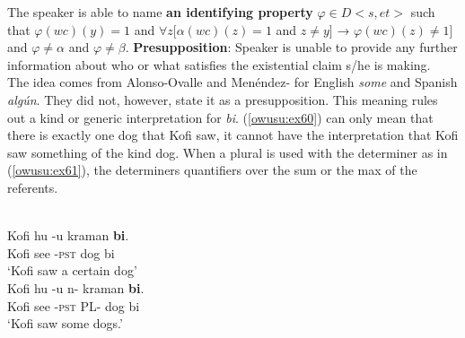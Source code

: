 \documentclass[output=paper,modfonts,nonflat,draftmode]{langsci/langscibook}
\begin{document}
\ex \label{51} The speaker is able to name \textbf{an identifying property} $\varphi \in D <s,et>$ such that $\varphi(wc)(y)=1$ and $\forall z[\alpha(wc)(z)=1$ and $z\neq y]$ → $\varphi(wc)(z)\neq 1]$ and $\varphi \neq \alpha$ and $\varphi \neq \beta$.
\ex \textbf{Presupposition}: Speaker is unable to provide any further information about who or what satisfies the existential claim s/he is making.\\ The idea comes from Alonso-Ovalle and Menéndez-\citet{Benito2003} for English \emph{some} and Spanish \emph{alg\'un}. They did not, however, state it as a presupposition.  
\z \z This meaning rules out a kind or generic interpretation for \emph{bi}. (\ref{owusu:ex60}) can only mean that there is exactly one dog that Kofi saw, it cannot have the interpretation that Kofi saw something of the kind dog. When a plural is used with the determiner as in (\ref{owusu:ex61}), the determiners quantifiers over the sum or the max of the referents.

\ea {}\\
\ea\label{owusu:ex60}
\gll Kofi hu -u kraman \textbf{bi}.\\
Kofi see -\textsc{pst} dog bi\\
\glt `Kofi saw a certain dog'\\
	
\ex \label{owusu:ex61}
\gll Kofi hu -u n-  kraman \textbf{bi}.\\
     Kofi see -\textsc{pst} PL- dog bi\\
\glt     `Kofi saw some dogs.' 
\end{document}
